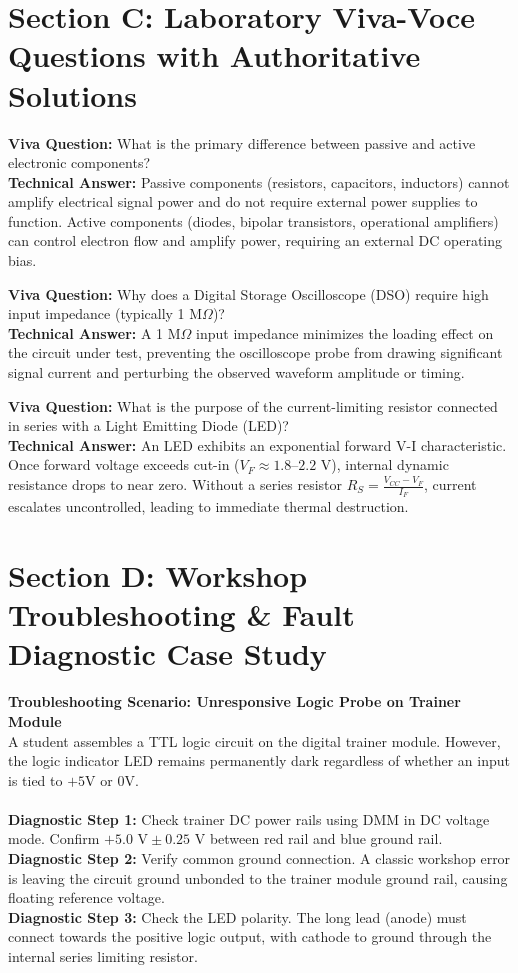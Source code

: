 \section{Section C: Laboratory Viva-Voce Questions with Authoritative Solutions}

\noindent\textbf{Viva Question:} What is the primary difference between passive and active electronic components?\\
\textbf{Technical Answer:} Passive components (resistors, capacitors, inductors) cannot amplify electrical signal power and do not require external power supplies to function. Active components (diodes, bipolar transistors, operational amplifiers) can control electron flow and amplify power, requiring an external DC operating bias.
\vspace{3mm}

\noindent\textbf{Viva Question:} Why does a Digital Storage Oscilloscope (DSO) require high input impedance (typically 1 M$\Omega$)?\\
\textbf{Technical Answer:} A 1 M$\Omega$ input impedance minimizes the loading effect on the circuit under test, preventing the oscilloscope probe from drawing significant signal current and perturbing the observed waveform amplitude or timing.
\vspace{3mm}

\noindent\textbf{Viva Question:} What is the purpose of the current-limiting resistor connected in series with a Light Emitting Diode (LED)?\\
\textbf{Technical Answer:} An LED exhibits an exponential forward V-I characteristic. Once forward voltage exceeds cut-in ($V_F \approx 1.8\text{--}2.2\text{ V}$), internal dynamic resistance drops to near zero. Without a series resistor $R_S = \frac{V_{CC} - V_F}{I_F}$, current escalates uncontrolled, leading to immediate thermal destruction.
\vspace{3mm}


\section{Section D: Workshop Troubleshooting \& Fault Diagnostic Case Study}

\textbf{Troubleshooting Scenario: Unresponsive Logic Probe on Trainer Module}\\
A student assembles a TTL logic circuit on the digital trainer module. However, the logic indicator LED remains permanently dark regardless of whether an input is tied to $+5\text{V}$ or $0\text{V}$.\\\\
\textbf{Diagnostic Step 1:} Check trainer DC power rails using DMM in DC voltage mode. Confirm $+5.0\text{ V} \pm 0.25\text{ V}$ between red rail and blue ground rail.\\
\textbf{Diagnostic Step 2:} Verify common ground connection. A classic workshop error is leaving the circuit ground unbonded to the trainer module ground rail, causing floating reference voltage.\\
\textbf{Diagnostic Step 3:} Check the LED polarity. The long lead (anode) must connect towards the positive logic output, with cathode to ground through the internal series limiting resistor.
\vspace{4mm}
